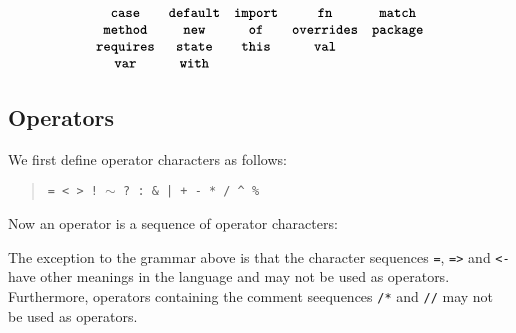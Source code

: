 \begin{quote}
 \oneof 
\end{quote}
\[
  \begin{array}{cccccc}
  \keyw{case} 
  & \keyw{default}
  & \keyw{import}
  & \keyw{fn}
  & \keyw{match}
  \\
  \keyw{method}
  & \keyw{new}
  & \keyw{of}
  & \keyw{overrides}
  & \keyw{package}
  \\
  \keyw{requires}
  & \keyw{state}
  & \keyw{this}
  & \keyw{val}
  \\
  \keyw{var}
  & \keyw{with}
  \\
  \vII{\keyw{dyn} & \keyw{dynamic} & \keyw{immutable} & \keyw{unique} & \keyw{none}}
  \end{array}
\]







\subsection{Operators}

We first define operator characters as follows:

\begin{quote}

 \oneof

 \texttt{= < > ! $\sim$ ? : \& | + - * / \^{} \%}

\end{quote}

Now an operator is a sequence of operator characters:

\begin{quote}


 {}

 {} 

\end{quote}

The exception to the grammar above is that the character sequences
\texttt{=}, \texttt{=>} and \texttt{<-} have other meanings in the
language and may not be used as operators.  Furthermore, operators
containing the comment seequences \texttt{/*} and \texttt{//} may not
be used as operators.
